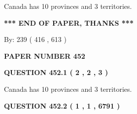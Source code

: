 \documentclass[12pt]{article}
\begin{document}
  
 
 
\noindent{}
 
 
Canada has 10  provinces and 3 territories.
 
 
 
 
   
   
 \vspace{0.2in}
 
   
   
   
   
\vspace{1.0in} 
{\textbf{\large{ *** END OF PAPER, THANKS *** }}} 
   
   
\hspace{1.0in} By: 
 239 ( 416 ,  613 )
   
   
   
   
\newpage 
\setcounter{page}{ 
   452001 } 
   
   
   
   
 {\textbf{ \Large{ PAPER NUMBER  452  }}}
   
   
\vspace{0.2in}
   
   
   
   
   
   
 \vspace{0.2in}
 
 
 
 
   
   
  
\vspace{0.2in}
  
{\textbf{\Large{QUESTION
452.1 
 ( 2 , 2 , 3 )
}}}
  
  
 
 
\noindent{}
 
 
Canada has 10  provinces and 3 territories.
 
 
 
 
  
\vspace{0.2in}
  
{\textbf{\Large{QUESTION
452.2 
 ( 1 , 1 , 6791 )
}}}
  
  
   
   
 \vspace{0.2in}
 
\end{document}
